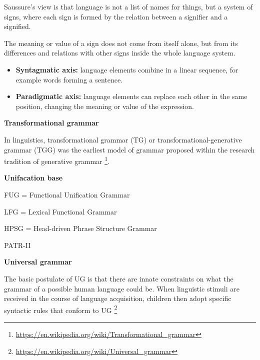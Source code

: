 \documentclass{book}
\providecommand{\ProjectDeepHeading}[2]{%
    \par\medskip\noindent\textbf{#2}\par\smallskip
}
\providecommand{\seeherefooter}[1]{\footnote{\url{#1}}}
\begin{document}
Saussure’s view \cite{saussure-1966-course-in-general-linguistics} is that language is not a list of names for things, but a system of signs, where each sign is formed by the relation between a signifier and a signified.
    
    The meaning or value of a sign does not come from itself alone, but from its differences and relations with other signs inside the whole language system.
    
    \begin{itemize}
        \item \textbf{Syntagmatic axis:} language elements combine in a linear sequence, for example words forming a sentence.
        \item \textbf{Paradigmatic axis:} language elements can replace each other in the same position, changing the meaning or value of the expression.
    \end{itemize}

\ProjectDeepHeading{5}{Transformational grammar}


In linguistics, transformational grammar (TG) or transformational-generative grammar (TGG) was the earliest model of grammar proposed within the research tradition of generative grammar \seeherefooter{https://en.wikipedia.org/wiki/Transformational_grammar}.

\ProjectDeepHeading{5}{Unifacation base}


FUG  = Functional Unification Grammar
    
    LFG  = Lexical Functional Grammar
    
    HPSG = Head-driven Phrase Structure Grammar
    
    PATR-II

\ProjectDeepHeading{5}{Universal grammar}


The
    basic postulate of UG is that there are innate constraints on what the grammar of a possible human language could be. When linguistic stimuli are received in the course of language acquisition, children then adopt specific syntactic rules that conform to UG
    \seeherefooter{https://en.wikipedia.org/wiki/Universal_grammar}
\end{document}
